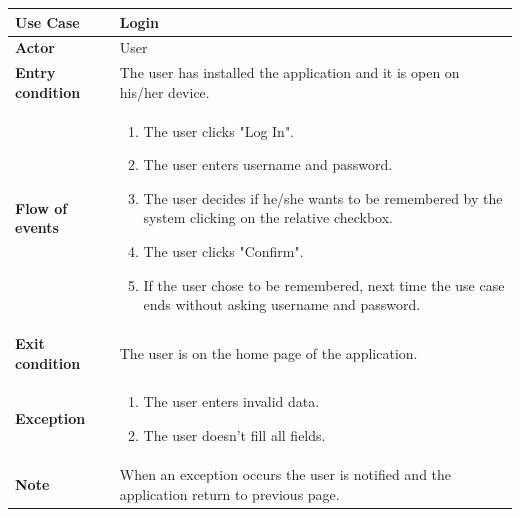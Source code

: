 \documentclass[../main.tex]{subfiles}
\begin{document}
	\vspace*{3cm}
	\begin{center}
		\begin{tabular}{p{3cm}p{8.28cm}}
			\hline
			\textbf{Use Case} & Login\\
			\hline
			\textbf{Actor} & User\\
			\hline
			\textbf{Entry condition} & The user has installed the application and it is open on his/her device.\\
			\hline
			\textbf{Flow of events} & \begin{enumerate}
				\linespread{0}\item The user clicks "Log In".
				\linespread{0}\item The user enters username and password.
				\linespread{0}\item The user decides if he/she wants to be remembered by the system clicking on the relative checkbox.
				\linespread{0}\item The user clicks "Confirm".
				\linespread{0}\item If the user chose to be remembered, next time the use case ends without asking username and password.
			\end{enumerate}\\
			\hline
			\textbf{Exit condition} & The user is on the home page of the application.\\
			\hline
			\textbf{Exception} & \begin{enumerate}
				\linespread{0}\item The user enters invalid data.
				\linespread{0}\item The user doesn't fill all fields.
			\end{enumerate}\\
			\hline
			\textbf{Note} & When an exception occurs the user is notified and the application return to previous page.\\
			\hline
		\end{tabular}
	\end{center}
	\vspace*{3cm}
\end{document}
